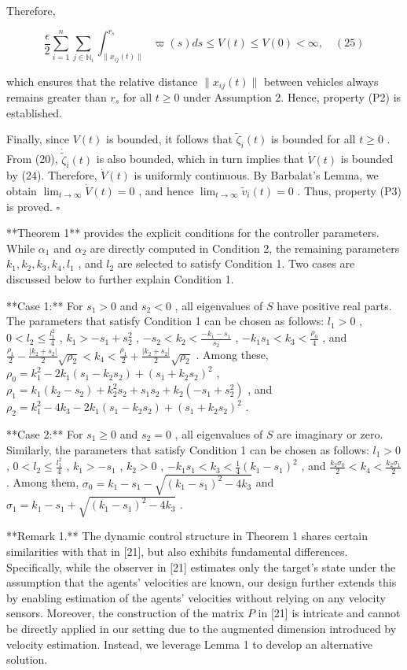 Therefore,

$$\frac{\epsilon}{2} \sum_{i=1}^n \sum_{j \in \mathbb{N}_i} \int_{\|x_{ij}(t)\|}^{r_s} \varpi(s) ds \leq V(t) \leq V(0) < \infty, \quad (25)$$

which ensures that the relative distance  $\|x_{ij}(t)\|$  between vehicles always remains greater than  $r_s$  for all  $t \geq 0$  under Assumption 2. Hence, property (P2) is established.

Finally, since  $V(t)$  is bounded, it follows that  $\tilde{\zeta}_i(t)$  is bounded for all  $t \geq 0$ . From (20),  $\dot{\tilde{\zeta}}_i(t)$  is also bounded, which in turn implies that  $\dot{V}(t)$  is bounded by (24). Therefore,  $\dot{V}(t)$  is uniformly continuous. By Barbalat's Lemma, we obtain  $\lim_{t \rightarrow \infty} \dot{V}(t) = 0$ , and hence  $\lim_{t \rightarrow \infty} \tilde{v}_i(t) = 0$ . Thus, property (P3) is proved.  $\square$

**Theorem 1** provides the explicit conditions for the controller parameters. While  $\alpha_1$  and  $\alpha_2$  are directly computed in Condition 2, the remaining parameters  $k_1, k_2, k_3, k_4, l_1$ , and  $l_2$  are selected to satisfy Condition 1. Two cases are discussed below to further explain Condition 1.

**Case 1:** For  $s_1 > 0$  and  $s_2 < 0$ , all eigenvalues of  $S$  have positive real parts. The parameters that satisfy Condition 1 can be chosen as follows:  $l_1 > 0$ ,  $0 < l_2 \leq \frac{l_1^2}{4}$ ,  $k_1 > -s_1 + s_2^2$ ,  $-s_2 < k_2 < \frac{-k_1 - s_1}{s_2}$ ,  $-k_1 s_1 < k_3 < \frac{\rho_0}{4}$ , and  $\frac{\rho_1}{2} - \frac{|k_2 + s_2|}{2} \sqrt{\rho_2} < k_4 < \frac{\rho_1}{2} + \frac{|k_2 + s_2|}{2} \sqrt{\rho_2}$ . Among these,  $\rho_0 = k_1^2 - 2k_1(s_1 - k_2 s_2) + (s_1 + k_2 s_2)^2$ ,  $\rho_1 = k_1(k_2 - s_2) + k_2^2 s_2 + s_1 s_2 + k_2(-s_1 + s_2^2)$ , and  $\rho_2 = k_1^2 - 4k_3 - 2k_1(s_1 - k_2 s_2) + (s_1 + k_2 s_2)^2$ .

**Case 2:** For  $s_1 \geq 0$  and  $s_2 = 0$ , all eigenvalues of  $S$  are imaginary or zero. Similarly, the parameters that satisfy Condition 1 can be chosen as follows:  $l_1 > 0$ ,  $0 < l_2 \leq \frac{l_1^2}{4}$ ,  $k_1 > -s_1$ ,  $k_2 > 0$ ,  $-k_1 s_1 < k_3 < \frac{1}{4}(k_1 - s_1)^2$ , and  $\frac{k_2 \sigma_0}{2} < k_4 < \frac{k_2 \sigma_1}{2}$ . Among them,  $\sigma_0 = k_1 - s_1 - \sqrt{(k_1 - s_1)^2 - 4k_3}$  and  $\sigma_1 = k_1 - s_1 + \sqrt{(k_1 - s_1)^2 - 4k_3}$ .

**Remark 1.** The dynamic control structure in Theorem 1 shares certain similarities with that in [21], but also exhibits fundamental differences. Specifically, while the observer in [21] estimates only the target's state under the assumption that the agents' velocities are known, our design further extends this by enabling estimation of the agents' velocities without relying on any velocity sensors. Moreover, the construction of the matrix  $P$  in [21] is intricate and cannot be directly applied in our setting due to the augmented dimension introduced by velocity estimation. Instead, we leverage Lemma 1 to develop an alternative solution.

